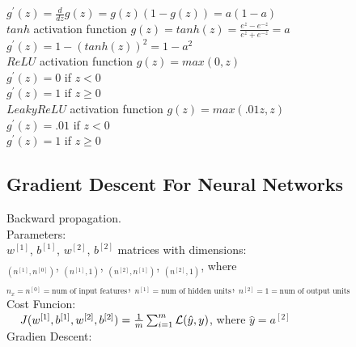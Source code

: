 \documentclass{article}
\begin{document}
$g^{'}(z)=\frac{d}{dz}g(z) =  g(z)(1-g(z)) = a(1-a)$\\

$tanh$ activation function $g(z)= tanh(z) = \frac{e^z-e^{-z}}{e^z+e^{-z}} = a$\\

$g^{'}(z)=1-(tanh(z))^2 = 1-a^2$\\

$ReLU$ activation function $g(z) = max(0,z)$\\

$g^{'}(z) = 0$ if $z < 0$\\

$g^{'}(z) = 1$ if $z \ge 0$\\

$Leaky ReLU$ activation function $g(z) = max(.01z,z)$\\

$g^{'}(z) = .01$ if $z<0$\\

$g^{'}(z) = 1$ if $z \ge 0$\\

\newpage
\subsection{Gradient Descent For Neural Networks}

Backward propagation.\\

Parameters:\\

$w^{[1]}$, $b^{[1]}$, $w^{[2]}$, $b^{[2]}$ matrices with dimensions:\\

$_{(n^{[1]}, n^{[0]})}$, $_{(n^{[1]}, 1)}$, $_{(n^{[2]}, n^{[1]})}$, $_{(n^{[2]}, 1)}$, where \\

$_{n_x = n^{[0]}=\text{num of input features}}$, $_{n^{[1]}= \text{num of hidden units}}$, $_{n^{[2]}=1=\text{num of output units}}$\\

Cost Funcion:\\

$\hspace{4mm} J(w^{[1]}, b^{[1]}, w^{[2]}, b^{[2]}) = \frac{1}{m} \sum_{i=1}^m \mathcal{L}(\hat{y}, y)$, where $\hat{y}=a^{[2]}$\\


Gradien Descent:\\
\end{document}
